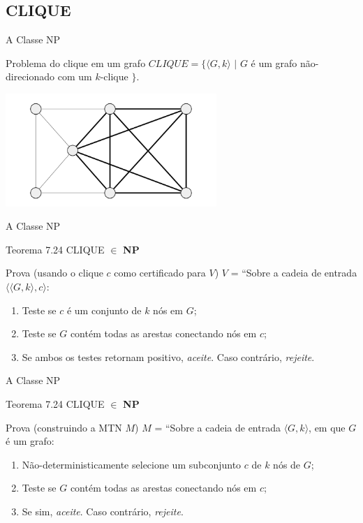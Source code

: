 \documentclass[xcolor=dvipsnames,table]{beamer}
\begin{document}
	\subsection{CLIQUE}
	\begin{frame}{A Classe NP}
		\begin{block}{Problema do clique em um grafo}
			$CLIQUE = \{ \langle G, k \rangle \mbox{ | } G$ é um grafo não-direcionado com um $k$-clique $\}$.
		\end{block}
		\begin{center}
			\includegraphics[width=8cm]{images/clique.png}
		\end{center}
	\end{frame}	
	
	\begin{frame}{A Classe NP}
		\begin{block}{Teorema 7.24}
			CLIQUE $\in$ {\bf NP}
		\end{block} 
		\begin{block}{Prova (usando o clique $c$ como certificado para $V$)}
			$V$ = ``Sobre a cadeia de entrada $\langle \langle G, k \rangle, c \rangle$:
			\begin{enumerate}
				\item Teste se $c$ é um conjunto de $k$ nós em $G$;
				\item Teste se $G$ contém todas as arestas conectando nós em $c$;
				\item Se ambos os testes retornam positivo, {\it aceite}. Caso contrário, {\it rejeite}.
			\end{enumerate}
		\end{block}
	\end{frame}
	
	\begin{frame}{A Classe NP}
		\begin{block}{Teorema 7.24}
			CLIQUE $\in$ {\bf NP}
		\end{block} 
		\begin{block}{Prova (construindo a MTN $M$)}
			$M$ = ``Sobre a cadeia de entrada $\langle G, k \rangle$, em que $G$ é um grafo:
			\begin{enumerate}
				\item Não-deterministicamente selecione um subconjunto $c$ de $k$ nós de $G$;
				\item Teste se $G$ contém todas as arestas conectando nós em $c$;
				\item Se sim, {\it aceite}. Caso contrário, {\it rejeite}.
			\end{enumerate}
		\end{block}
	\end{frame}
		
\end{document}
